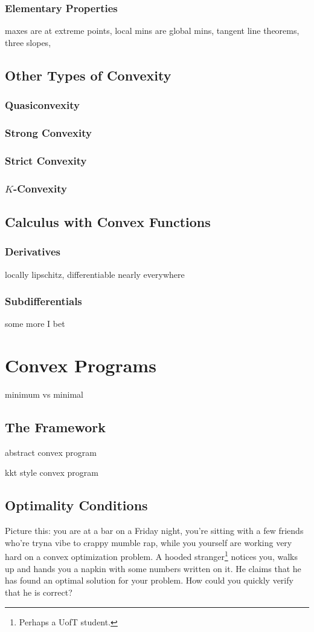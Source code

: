 \documentclass{article}
\numberwithin{equation}{section}
\theoremstyle{definition}
\begin{document}
\subsubsection{Elementary Properties}
 maxes are at extreme points, local mins are global mins, tangent line theorems, three slopes,
\subsection{Other Types of Convexity}
\subsubsection{Quasiconvexity}
\subsubsection{Strong Convexity}
\subsubsection{Strict Convexity}
\subsubsection{$K$-Convexity}

\subsection{Calculus with Convex Functions}
\subsubsection{Derivatives}
locally lipschitz, differentiable nearly everywhere
\subsubsection{Subdifferentials}
some more I bet
\section{Convex Programs}
minimum vs minimal
\subsection{The Framework}
abstract convex program

kkt style convex program
\subsection{Optimality Conditions}
Picture this: you are at a bar on a Friday night, you're sitting with a few friends who're tryna vibe to crappy mumble rap, while you yourself are working very hard on a convex optimization problem. A hooded stranger\footnote{Perhaps a UofT student.} notices you, walks up and hands you a napkin with some numbers written on it. He claims that he has found an optimal solution for your problem. How could you quickly verify that he is correct?
\end{document}
